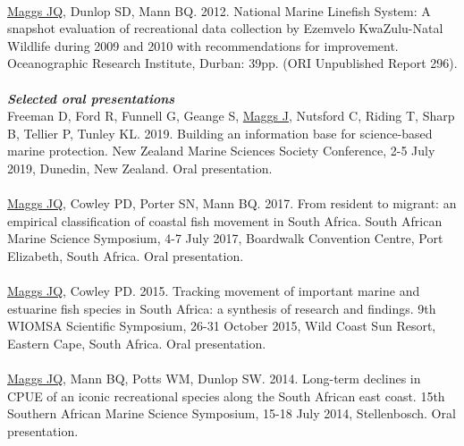 \documentclass[10pt,a4paper]{article}
\begin{document}
\\
\underline{Maggs JQ}, Dunlop SD, Mann BQ. 2012. National Marine Linefish System: A snapshot evaluation of recreational data collection by Ezemvelo KwaZulu-Natal Wildlife during 2009 and 2010 with recommendations for improvement. Oceanographic Research Institute, Durban: 39pp. (ORI Unpublished Report 296).\\
\\
\textit{\textbf{Selected oral presentations}}\\
Freeman D, Ford R, Funnell G, Geange S, \underline{Maggs J}, Nutsford C, Riding T, Sharp B, Tellier P, Tunley KL. 2019. Building an information base for science-based marine protection. New Zealand Marine Sciences Society Conference, 2-5 July 2019, Dunedin, New Zealand. Oral presentation.\\
\\
\underline{Maggs JQ}, Cowley PD, Porter SN, Mann BQ. 2017. From resident to migrant: an empirical classification of coastal fish movement in South Africa. South African Marine Science Symposium, 4-7 July 2017, Boardwalk Convention Centre, Port Elizabeth, South Africa. Oral presentation.\\
\\
\underline{Maggs JQ}, Cowley PD. 2015. Tracking movement of important marine and estuarine fish species in South Africa: a synthesis of research and findings. 9th WIOMSA Scientific Symposium, 26-31 October 2015, Wild Coast Sun Resort, Eastern Cape, South Africa. Oral presentation.\\
\\
\underline{Maggs JQ}, Mann BQ, Potts WM, Dunlop SW. 2014. Long-term declines in CPUE of an iconic recreational species along the South African east coast. 15th Southern African Marine Science Symposium, 15-18 July 2014, Stellenbosch. Oral presentation.\\
\\
\end{document}

